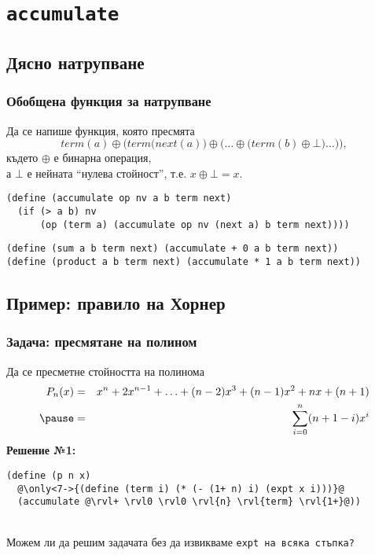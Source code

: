 \documentclass{beamer}
\begin{document}
\section{\tt{accumulate}}

\subsection{Дясно натрупване}

\begin{frame}[fragile]
  \frametitle{Обобщена функция за натрупване}

  Да се напише функция, която пресмята
  \begin{equation*}
    term(a) \oplus \bigg(term\big(next(a)\big) \oplus \Big(\ldots \oplus \big(term(b) \oplus \bot\big) \ldots\Big)\bigg),
  \end{equation*}
  където $\oplus$ е бинарна операция,\\
  а $\bot$ е нейната ``нулева стойност'', т.е. $x\oplus\bot = x$.
  \pause
  \small
\begin{lstlisting}
(define (accumulate op nv a b term next)
  (if (> a b) nv
      (op (term a) (accumulate op nv (next a) b term next))))
\end{lstlisting}
  \pause
\begin{lstlisting}
(define (sum a b term next) (accumulate + 0 a b term next))
(define (product a b term next) (accumulate * 1 a b term next))
\end{lstlisting}
\end{frame}

\subsection{Пример: правило на Хорнер}

\newcommand{\pnx}{x^n + 2x^{n-1} + \ldots + (n-2)x^3 + (n-1)x^2 + nx + (n+1)}

\begin{frame}[fragile]
  \frametitle{Задача: пресмятане на полином}

  Да се пресметне стойността на полинома
  \begin{eqnarray*}
  P_n(x) &=& \pnx\\
\pause   &=& \sum_{i=0}^n (n+1-i)x^i
  \end{eqnarray*}
  \pause
  \textbf{Решение №1:}
\begin{lstlisting}
(define (p n x)
  @\only<7->{(define (term i) (* (- (1+ n) i) (expt x i)))}@
  (accumulate @\rvl+ \rvl0 \rvl0 \rvl{n} \rvl{term} \rvl{1+}@))
\end{lstlisting}\ \\[1em]
  \onslide<+->
  \alert{Можем ли да решим задачата без да извикваме \tt{expt} на всяка стъпка?}
\end{frame}
\end{document}
